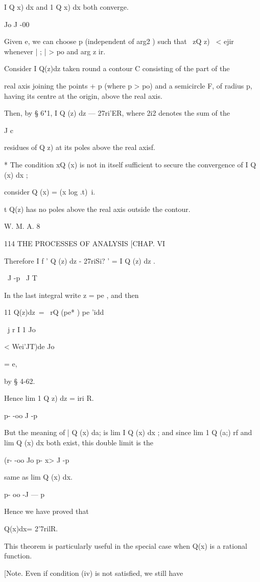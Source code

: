 I Q x) dx and 1 Q x) dx both converge.

Jo J -00

Given e, we can choose p (independent of arg2 ) such that \ zQ z) \ <
ejir whenever | ; | > po and arg z ir.

Consider I Q(z)dz taken round a contour C consisting of the part of
the

real axis joining the points + p (where p > po) and a semicircle F, of
radius p, having its centre at the origin, above the real axis.

Then, by § 6"1, I Q (z) dz — 27ri'ER, where 2i2 denotes the sum of the

J c

residues of Q z) at its poles above the real axisf.

* The condition xQ (x) is not in itself sufficient to secure the
convergence of I Q (x) dx ;

consider Q (x) = (x log .t)~i.

t Q(z) has no poles above the real axis outside the contour.

W. M. A. 8



114 THE PROCESSES OF ANALYSIS [CHAP. VI

Therefore I f ' Q (z) dz - 27riSi? ' = I Q (z) dz .

\ J -p \ J T

In the last integral write z = pe , and then

11 Q(z)dz\ = \ rQ (pe* ) pe 'idd

\ j r I 1 Jo

< Wei'JT)de Jo

= e,

by § 4-62.

Hence lim 1 Q z) dz = iri R.

p- -oo J -p

But the meaning of | Q (x) da; is lim I Q (x) dx ; and since lim 1 Q
(a;) rf and lim Q (x) dx both exist, this double limit is the

(r- -oo Jo p- x> J -p

same as lim Q (x) dx.

p- oo -J — p

Hence we have proved that

Q(x)dx= 2'7rilR.



This theorem is particularly useful in the special case when Q(x) is a
rational function.

[Note. Even if condition (iv) is not satisfied, we still have

